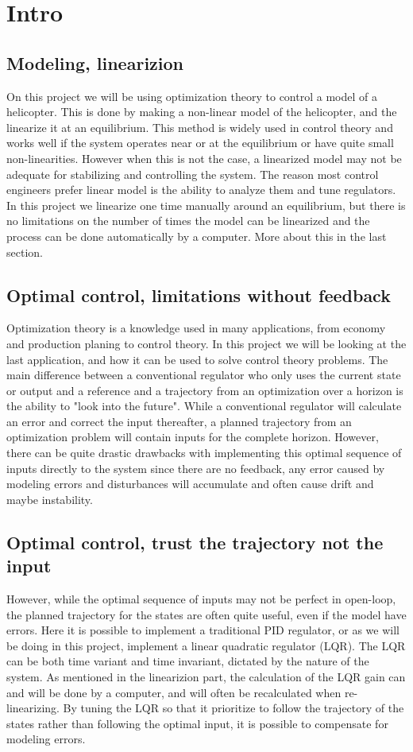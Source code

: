 \section{Intro}
\subsection{Modeling, linearizion}
On this project we will be using optimization theory to control a model of a helicopter. This is done by making a non-linear model of the helicopter, and the linearize it at an equilibrium. This method is widely used in control theory and works well if the system operates near or at the equilibrium or have quite small non-linearities. However when this is not the case, a linearized model may not be adequate for stabilizing and controlling the system. The reason most control engineers prefer linear model is the ability to analyze them and tune regulators. In this project we linearize one time manually around an equilibrium, but there is no limitations on the number of times the model can be linearized and the process can be done automatically by a computer. More about this in the last section.

\subsection{Optimal control, limitations without feedback}
Optimization theory is a knowledge used in many applications, from economy and production planing to control theory. In this project we will be looking at the last application, and how it can be used to solve control theory problems. The main difference between a conventional regulator who only uses the current state or output and a reference and a trajectory from an optimization over a horizon is the ability to "look into the future". While a conventional regulator will calculate an error and correct the input thereafter, a planned trajectory from an optimization problem will contain inputs for the complete horizon. However, there can be quite drastic drawbacks with implementing this optimal sequence of inputs directly to the system since there are no feedback, any error caused by modeling errors and disturbances will accumulate and often cause drift and maybe instability.

\subsection{Optimal control, trust the trajectory not the input}
However, while the optimal sequence of inputs may not be perfect in open-loop, the planned trajectory for the states are often quite useful, even if the model have errors. Here it is possible to implement a traditional PID regulator, or as we will be doing in this project, implement a linear quadratic regulator (LQR). The LQR can be both time variant and time invariant, dictated by the nature of the system. As mentioned in the linearizion part, the calculation of the LQR gain can and will be done by a computer, and will often be recalculated when re-linearizing. By tuning the LQR so that it prioritize to follow the trajectory of the states rather than following the optimal input, it is possible to compensate for modeling errors.

